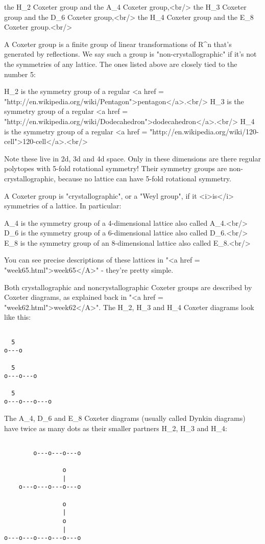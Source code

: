 the H_{2} Coxeter group and the A_{4} Coxeter group,<br/>
the H_{3} Coxeter group and the D_{6} Coxeter group,<br/>
the H_{4} Coxeter group and the E_{8} Coxeter group.<br/>

A Coxeter group is a finite group of linear transformations of 
R^{n} that's generated by reflections.  We say such a group is
"non-crystallographic" if it's not the symmetries of any lattice. 
The ones listed above are closely tied to the number 5:

H_{2} is the symmetry group of a regular 
<a href = "http://en.wikipedia.org/wiki/Pentagon">pentagon</a>.<br/>
H_{3} is the symmetry group of a regular <a href = "http://en.wikipedia.org/wiki/Dodecahedron">dodecahedron</a>.<br/>
H_{4} is the symmetry group of a regular <a href = "http://en.wikipedia.org/wiki/120-cell">120-cell</a>.<br/>

Note these live in 2d, 3d and 4d space.  Only in these dimensions 
are there regular polytopes with 5-fold rotational symmetry!  Their 
symmetry groups are non-crystallographic, because no lattice can 
have 5-fold rotational symmetry.

A Coxeter group is "crystallographic", or a "Weyl
group", if it <i>is</i> symmetries of a lattice.  In particular:

A_{4} is the symmetry group of a 4-dimensional lattice also
called A_{4}.<br/> 
D_{6} is the symmetry group of a 6-dimensional lattice also 
called D_{6}.<br/> 
E_{8} is the symmetry group of an 8-dimensional lattice also 
called
E_{8}.<br/>

You can see precise descriptions of these lattices in "<a href = "week65.html">week65</A>" -
they're pretty simple.

Both crystallographic and noncrystallographic Coxeter groups are 
described by Coxeter diagrams, as explained back in "<a href = "week62.html">week62</A>".  The 
H_{2}, H_{3} and H_{4} Coxeter diagrams look like this:


\begin{verbatim}

  5
o---o

  5
o---o---o

  5
o---o---o---o
\end{verbatim}
    

The A_{4}, D_{6} and E_{8} Coxeter diagrams (usually
called Dynkin diagrams) have twice as many dots as their smaller
partners H_{2}, H_{3} and H_{4}:
 

\begin{verbatim}

        o---o---o---o

                o
                |
    o---o---o---o---o

                o
                |
                o
                | 
o---o---o---o---o---o
\end{verbatim}
    

